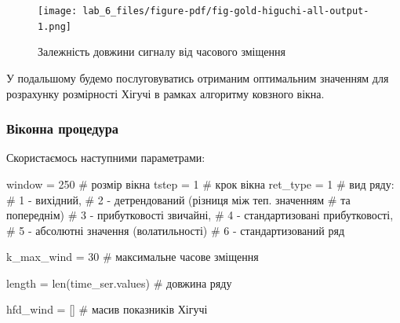 \documentclass[
  letterpaper,
]{report}
\newenvironment{Shaded}{\begin{snugshade}}{\end{snugshade}}
\newcommand{\BuiltInTok}[1]{\textcolor[rgb]{0.00,0.23,0.31}{#1}}
\newcommand{\CommentTok}[1]{\textcolor[rgb]{0.37,0.37,0.37}{#1}}
\newcommand{\DecValTok}[1]{\textcolor[rgb]{0.68,0.00,0.00}{#1}}
\newcommand{\NormalTok}[1]{\textcolor[rgb]{0.00,0.23,0.31}{#1}}
\newcommand{\OperatorTok}[1]{\textcolor[rgb]{0.37,0.37,0.37}{#1}}
\begin{document}
\begin{figure}[H]

{\centering \texttt{[image: lab\_6\_files/figure-pdf/fig-gold-higuchi-all-output-1.png]}

}

\caption{\label{fig-gold-higuchi-all}Залежність довжини сигналу від
часового зміщення}

\end{figure}

У подальшому будемо послуговуватись отриманим оптимальним значенням для
розрахунку розмірності Хігучі в рамках алгоритму ковзного вікна.

\hypertarget{ux432ux456ux43aux43eux43dux43dux430-ux43fux440ux43eux446ux435ux434ux443ux440ux430-3}{%
\subsubsection{Віконна
процедура}\label{ux432ux456ux43aux43eux43dux43dux430-ux43fux440ux43eux446ux435ux434ux443ux440ux430-3}}

Скористаємось наступними параметрами:

\begin{Shaded}
\begin{Highlighting}[]
\NormalTok{window }\OperatorTok{=} \DecValTok{250}    \CommentTok{\# розмір вікна}
\NormalTok{tstep }\OperatorTok{=} \DecValTok{1}       \CommentTok{\# крок вікна}
\NormalTok{ret\_type }\OperatorTok{=} \DecValTok{1}    \CommentTok{\# вид ряду: }
                \CommentTok{\# 1 {-} вихідний, }
                \CommentTok{\# 2 {-} детрендований (різниця між теп. значенням }
                                                \CommentTok{\# та попереднім)}
                \CommentTok{\# 3 {-} прибутковості звичайні, }
                \CommentTok{\# 4 {-} стандартизовані прибутковості, }
                \CommentTok{\# 5 {-} абсолютні значення (волатильності)}
                \CommentTok{\# 6 {-} стандартизований ряд}

\NormalTok{k\_max\_wind }\OperatorTok{=} \DecValTok{30}                    \CommentTok{\# максимальне часове зміщення}

\NormalTok{length }\OperatorTok{=} \BuiltInTok{len}\NormalTok{(time\_ser.values)      }\CommentTok{\# довжина ряду}

\NormalTok{hfd\_wind }\OperatorTok{=}\NormalTok{ []                      }\CommentTok{\# масив показників Хігучі}
\end{Highlighting}
\end{Shaded}
\end{document}
